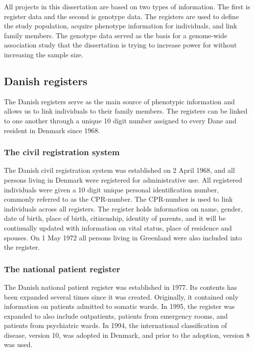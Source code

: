 All projects in this dissertation are based on two types of information. The first is register data and the second is genotype data. The registers are used to define the study population, acquire phenotype information for individuals, and link family members. The genotype data served as the basis for a genome-wide association study that the dissertation is trying to increase power for without increasing the sample size. 

\subsection{Danish registers}
The Danish registers serve as the main source of phenotypic information and allows us to link individuals to their family members. The registers can be linked to one another through a unique 10 digit number assigned to every Dane and resident in Denmark since 1968.  

\subsubsection{The civil registration system}
The Danish civil registration system was established on 2 April 1968, and all persons living in Denmark were registered for administrative use. All registered individuals were given a 10 digit unique personal identification number, commonly referred to as the CPR-number. The CPR-number is used to link individuals across all registers. The register holds information on name, gender, date of birth, place of birth, citizenship, identity of parents, and it will be continually updated with information on vital status, place of residence and spouses. On 1 May 1972 all persons living in Greenland were also included into the register. \cite{pedersen2011danish}

\subsubsection{The national patient register}
The Danish national patient register was established in 1977. Its contents has been expanded several times since it was created. Originally, it contained only information on patients admitted to somatic wards. In 1995, the register was expanded to also include outpatients, patients from emergency rooms, and patients from psychiatric wards. In 1994, the international classification of disease, version 10, was adopted in Denmark, and prior to the adoption, version 8 was used. \cite{lynge2011danish}


